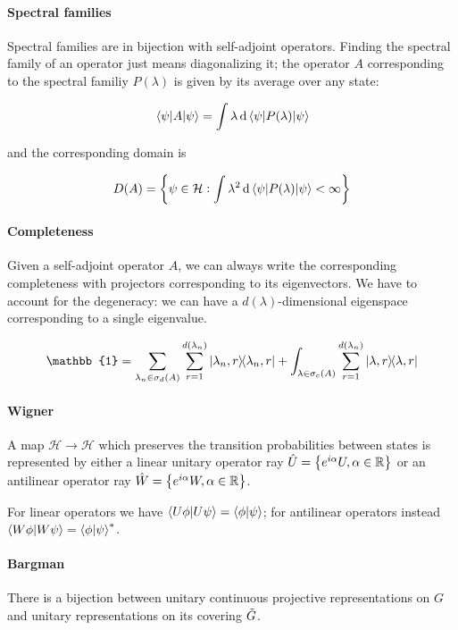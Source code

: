 \documentclass[main.tex]{subfiles}
\begin{document}
\paragraph{Spectral families} Spectral families are in bijection with self-adjoint operators. Finding the spectral family of an operator just means diagonalizing it; the operator $A$ corresponding to the spectral familiy  $P(\lambda)$ is given by its average over any state:

\begin{equation}
    \ev{A}{\psi} = \int \lambda \dd{\ev{P(\lambda)}{\psi}}
\end{equation}

and the corresponding domain is

\begin{equation}
    D(A) = \qty{
    \psi \in \mathcal{H}: \int \lambda^2 \dd{\ev{P(\lambda)}{\psi}} < \infty
    }
\end{equation}


\paragraph{Completeness} Given a self-adjoint operator $A$, we can always write the corresponding completeness with projectors corresponding to its eigenvectors. We have to account for the degeneracy: we can have a  $d(\lambda)$-dimensional eigenspace corresponding to a single eigenvalue.

\begin{equation} \label{eq-completeness}
\mathbb{1} = \sum_{\lambda_n \in \sigma_d(A)} \sum_{r=1}^{d(\lambda_n)} \dyad{\lambda_n, r} + \int_{\lambda\in \sigma_c(A)} \sum_{r=1}^{d(\lambda_n)} \dyad{\lambda, r}
\end{equation}

\paragraph{Wigner} A map $\mathcal{H} \rightarrow \mathcal{H}$ which preserves the transition probabilities between states is represented by either a linear unitary operator ray $\hat{U} = \qty{e^{i\alpha} U, \alpha \in \mathbb{R}}$ or an antilinear operator ray $\hat{W} = \qty{e^{i\alpha} W, \alpha \in \mathbb{R}}$.

For linear operators we have $\braket{U\phi}{U\psi}=\braket{\phi}{\psi}$; for antilinear operators instead $\braket{W\phi}{W\psi}=\braket{\phi}{\psi}^*$.

\paragraph{Bargman} There is a bijection between unitary continuous projective representations on $G$ and unitary representations on its covering $\Tilde{G}$.
\end{document}
